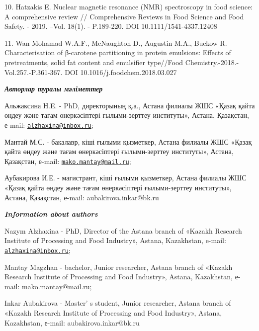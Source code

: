 \begin{references}
10. Hatzakis E. Nuclear magnetic resonance (NMR) spectroscopy in food
science: A comprehensive review // Comprehensive Reviews in Food Science
and Food Safety. - 2019. --Vol. 18(1). - P.189-220. DOI
10.1111/1541-4337.12408

11. Wan Mohamad W.A.F., McNaughton D., Augustin M.A., Buckow R.
Characterisation of β-carotene partitioning in protein emulsions:
Effects of pretreatments, solid fat content and emulsifier type//Food
Chemistry.-2018.-Vol.257.-P.361-367. DOI 10.1016/j.foodchem.2018.03.027
\end{references}

\begin{authorinfo}
\emph{{\bfseries Авторлар туралы мәліметтер}}

Альжаксина Н.E. - PhD, директорының қ.а., Астана филиалы ЖШС «Қазақ
қайта өңдеу және тағам өнеркәсіптері ғылыми-зерттеу институты», Астана,
Қазақстан, е-mail:
\href{mailto:alzhaxina@inbox.ru}{\nolinkurl{alzhaxina@inbox.ru}};

Мантай М.С. - бакалавр, кіші ғылыми қызметкер, Астана филиалы ЖШС «Қазақ
қайта өңдеу және тағам өнеркәсіптері ғылыми-зерттеу институты», Астана,
Қазақстан, е-mail:
\href{mailto:mako.mantay@mail.ru}{\nolinkurl{mako.mantay@mail.ru}};

Аубакирова И.Е. - магистрант, кіші ғылыми қызметкер, Астана филиалы ЖШС
«Қазақ қайта өңдеу және тағам өнеркәсіптері ғылыми-зерттеу институты»,
Астана, Қазақстан, е-mail: aubakirova.inkar@bk.ru

\emph{{\bfseries Information about authors}}

Nazym Alzhaxina - PhD, Director of the Astana branch of «Kazakh Research
Institute of Processing and Food Industry», Astana, Kazakhstan, e-mail:
\href{mailto:alzhaxina@inbox.ru}{\nolinkurl{alzhaxina@inbox.ru}};

Mantay Magzhan - bachelor, Junior researcher, Astana branch of «Kazakh
Research Institute of Processing and Food Industry», Astana, Kazakhstan,
е-mail: mako.mantay@mail.ru;~

Inkar Aubakirova - Master' s student, Junior researcher,
Astana branch of «Kazakh Research Institute of Processing and Food
Industry», Astana, Kazakhstan, е-mail: aubakirova.inkar@bk.ru
\end{authorinfo}
